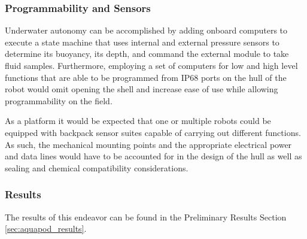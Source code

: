 \subsubsection{Programmability and Sensors}

Underwater autonomy can be accomplished by adding onboard computers to execute a state machine that uses internal and external pressure sensors to determine its buoyancy, its depth, and command the external module to take fluid samples. Furthermore, employing a set of computers for low and high level functions that are able to be programmed from IP68 ports on the hull of the robot would omit opening the shell and increase ease of use while allowing programmability on the field. 

As a platform it would be expected that one or multiple robots could be equipped with backpack sensor suites capable of carrying out different functions. As such, the mechanical mounting points and the appropriate electrical power and data lines would have to be accounted for in the design of the hull as well as sealing and chemical compatibility considerations. 

\subsubsection{Results}

The results of this endeavor can be found in the Preliminary Results Section \ref{sec:aquapod_results}. 

%


